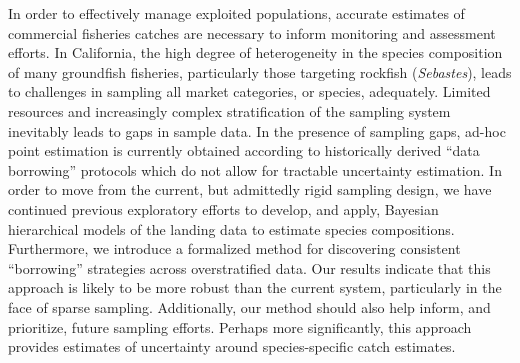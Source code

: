 In order to effectively manage exploited populations, accurate estimates
of commercial fisheries catches are necessary to inform monitoring and
assessment efforts. In California, the high degree of heterogeneity in
the species composition of many groundfish fisheries, particularly those
targeting rockfish (\emph{Sebastes}), leads to challenges in sampling
all market categories, or species, adequately. Limited resources and
increasingly complex stratification of the sampling system inevitably
leads to gaps in sample data. In the presence of sampling gaps, ad-hoc
point estimation is currently obtained according to historically derived
``data borrowing'' protocols which do not allow for tractable
uncertainty estimation. In order to move from the current, but
admittedly rigid sampling design, we have continued previous exploratory
efforts to develop, and apply, Bayesian hierarchical models of the
landing data to estimate species compositions. Furthermore, we introduce
a formalized method for discovering consistent ``borrowing'' strategies
across overstratified data. Our results indicate that this approach is
likely to be more robust than the current system, particularly in the
face of sparse sampling. Additionally, our method should also help
inform, and prioritize, future sampling efforts. Perhaps more
significantly, this approach provides estimates of uncertainty around
species-specific catch estimates.
